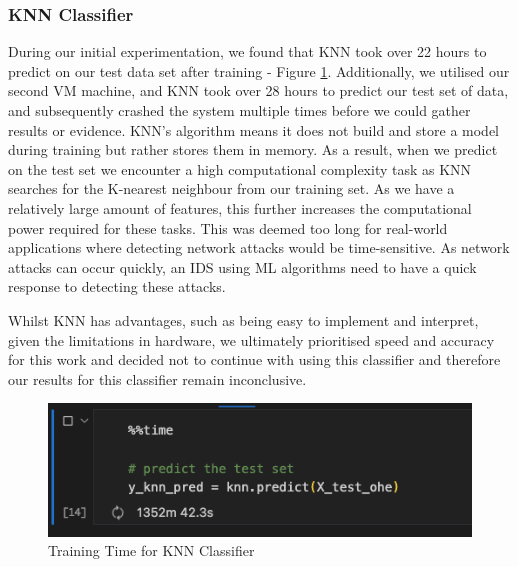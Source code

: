 \subsubsection{KNN Classifier}

During our initial experimentation, we found that KNN took over 22 hours to predict on our test data set after training - Figure \ref{fig:knn_train}. Additionally, we utilised our second VM machine, and KNN took over 28 hours to predict our test set of data, and subsequently crashed the system multiple times before we could gather results or evidence. KNN's algorithm means it does not build and store a model during training but rather stores them in memory. As a result, when we predict on the test set we encounter a high computational complexity task as KNN searches for the K-nearest neighbour from our training set. As we have a relatively large amount of features, this further increases the computational power required for these tasks. This was deemed too long for real-world applications where detecting network attacks would be time-sensitive. As network attacks can occur quickly, an IDS using ML algorithms need to have a quick response to detecting these attacks.

Whilst KNN has advantages, such as being easy to implement and interpret, given the limitations in hardware, we ultimately prioritised speed and accuracy for this work and decided not to continue with using this classifier and therefore our results for this classifier remain inconclusive.

\medskip

\begin{figure}[h]
\caption{Training Time for KNN Classifier}
\label{fig:knn_train}
\centering
\includegraphics[width=\textwidth]{Appendices/Images/knn_predict-2023-04-15.png}
\end{figure}